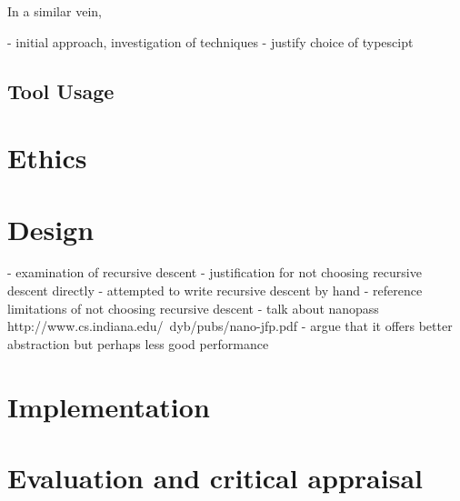 \documentclass{article}
\begin{document}
In a similar vein, 





- initial approach, investigation of techniques
- justify choice of typescipt

\subsection{Tool Usage}

\section{Ethics}

\section{Design}
 
- examination of recursive descent 
- justification for not choosing recursive descent directly
    - attempted to write recursive descent by hand
- reference limitations of not choosing recursive descent
- talk about nanopass
 http://www.cs.indiana.edu/~dyb/pubs/nano-jfp.pdf
- argue that it offers better abstraction but perhaps less good performance

\section{Implementation}
 
\section{Evaluation and critical appraisal}
\end{document}
